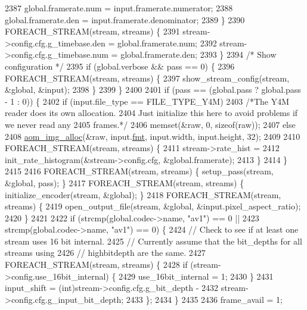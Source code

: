 \begin{DoxyCodeInclude}
{{{{{{{{{{{{{{{{{{{{{{{{{{{{{{{{{{{{{{{{{{{{{{{{{{{{{{{2387       global.framerate.num = input.framerate.numerator;
2388       global.framerate.den = input.framerate.denominator;
2389     \}
2390     FOREACH\_STREAM(stream, streams) \{
2391       stream->config.cfg.g\_timebase.den = global.framerate.num;
2392       stream->config.cfg.g\_timebase.num = global.framerate.den;
2393     \}
2394     \textcolor{comment}{/* Show configuration */}
2395     \textcolor{keywordflow}{if} (global.verbose && pass == 0) \{
2396       FOREACH\_STREAM(stream, streams) \{
2397         show\_stream\_config(stream, &global, &input);
2398       \}
2399     \}
2400 
2401     \textcolor{keywordflow}{if} (pass == (global.pass ? global.pass - 1 : 0)) \{
2402       \textcolor{keywordflow}{if} (input.file\_type == FILE\_TYPE\_Y4M)
2403         \textcolor{comment}{/*The Y4M reader does its own allocation.}
2404 \textcolor{comment}{          Just initialize this here to avoid problems if we never read any}
2405 \textcolor{comment}{          frames.*/}
2406         memset(&raw, 0, \textcolor{keyword}{sizeof}(raw));
2407       \textcolor{keywordflow}{else}
2408         \hyperlink{aom__image_8h_a570db29fbd122951235a08fe9375f6bb}{aom\_img\_alloc}(&raw, input.\hyperlink{structaom__image_a6c64b1ab918d80d52eb8f5d6d957e825}{fmt}, input.width, input.height, 32);
2409 
2410       FOREACH\_STREAM(stream, streams) \{
2411         stream->rate\_hist =
2412             init\_rate\_histogram(&stream->config.cfg, &global.framerate);
2413       \}
2414     \}
2415 
2416     FOREACH\_STREAM(stream, streams) \{ setup\_pass(stream, &global, pass); \}
2417     FOREACH\_STREAM(stream, streams) \{ initialize\_encoder(stream, &global); \}
2418     FOREACH\_STREAM(stream, streams) \{
2419       open\_output\_file(stream, &global, &input.pixel\_aspect\_ratio);
2420     \}
2421 
2422     \textcolor{keywordflow}{if} (strcmp(global.codec->name, \textcolor{stringliteral}{"av1"}) == 0 ||
2423         strcmp(global.codec->name, \textcolor{stringliteral}{"av1"}) == 0) \{
2424       \textcolor{comment}{// Check to see if at least one stream uses 16 bit internal.}
2425       \textcolor{comment}{// Currently assume that the bit\_depths for all streams using}
2426       \textcolor{comment}{// highbitdepth are the same.}
2427       FOREACH\_STREAM(stream, streams) \{
2428         \textcolor{keywordflow}{if} (stream->config.use\_16bit\_internal) \{
2429           use\_16bit\_internal = 1;
2430         \}
2431         input\_shift = (int)stream->config.cfg.g\_bit\_depth -
2432                       stream->config.cfg.g\_input\_bit\_depth;
2433       \};
2434     \}
2435 
2436     frame\_avail = 1;
}}}}}}}}}}}}}}}}}}}}}}}}}}}}}}}}}}}}}}}}}}}}}}}}}}}}}}}
\end{DoxyCodeInclude}
